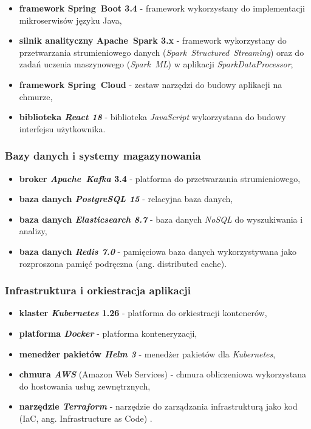 \begin{itemize}
    \item \textbf{framework \mbox{Spring Boot} 3.4} - framework wykorzystany do implementacji mikroserwisów języku Java,
    \item \textbf{silnik analityczny \mbox{Apache Spark} 3.x} \cite{spark_streaming} - framework wykorzystany do przetwarzania strumieniowego danych (\mbox{\textit{Spark Structured Streaming}}) \cite{chambers2018spark} oraz do zadań uczenia maszynowego (\mbox{\textit{Spark ML}}) w aplikacji \textit{SparkDataProcessor},
    \item \textbf{framework \mbox{Spring Cloud}} - zestaw narzędzi do budowy aplikacji na chmurze,
    \item \textbf{biblioteka \textit{React 18}} - biblioteka \textit{JavaScript} wykorzystana do budowy interfejsu użytkownika.
\end{itemize}

\subsubsection{Bazy danych i systemy magazynowania}
\label{subsubsec:bazy_danych}

\begin{itemize}
    \item \textbf{broker \mbox{\textit{Apache Kafka}} 3.4} \cite{kafka} - platforma do przetwarzania strumieniowego,
    \item \textbf{baza danych \textit{PostgreSQL 15}} - relacyjna baza danych,
    \item \textbf{baza danych \textit{Elasticsearch 8.7}} - baza danych \mbox{\textit{NoSQL}} \cite{nosql_definition} do wyszukiwania i analizy,
    \item \textbf{baza danych \textit{Redis 7.0}} - pamięciowa baza danych wykorzystywana jako rozproszona pamięć podręczna (ang. distributed cache).
\end{itemize}

\subsubsection{Infrastruktura i orkiestracja aplikacji}
\label{subsubsec:infrastruktura}

\begin{itemize}
    \item \textbf{klaster \textit{Kubernetes} 1.26} \cite{kubernetes} - platforma do orkiestracji kontenerów,
    \item \textbf{platforma \textit{Docker}} - platforma konteneryzacji,
    \item \textbf{menedżer pakietów \textit{Helm 3}} - menedżer pakietów dla \textit{Kubernetes},
    \item \textbf{chmura \textit{AWS}} (Amazon Web Services) \cite{aws_definition} - chmura obliczeniowa wykorzystana do hostowania usług zewnętrznych,
    \item \textbf{narzędzie \textit{Terraform}} - narzędzie do zarządzania infrastrukturą jako kod (IaC, ang. Infrastructure as Code) \cite{terraform_docs}.
\end{itemize}


